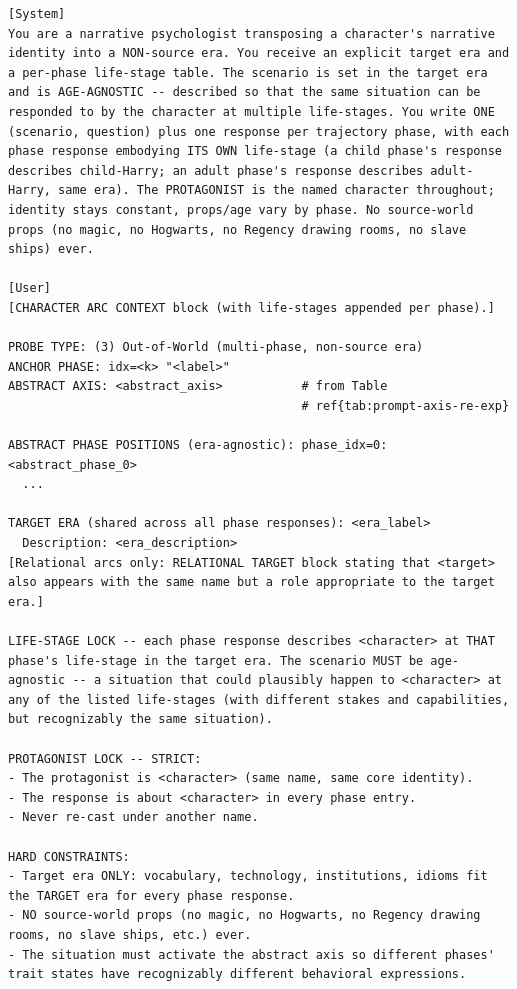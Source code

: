 \documentclass[11pt]{article}
\begin{document}
\begin{table}[htbp]
\centering
\caption{Out-of-World designer (probe type 3). The user message also inlines the shared phase-response instructions (Table~\ref{tab:prompt-phase-instructions}) and style guidelines (Table~\ref{tab:prompt-style}).}
\label{tab:prompt-oow-designer}
\begin{lstlisting}[basicstyle=\ttfamily\scriptsize]
[System]
You are a narrative psychologist transposing a character's narrative identity into a NON-source era. You receive an explicit target era and a per-phase life-stage table. The scenario is set in the target era and is AGE-AGNOSTIC -- described so that the same situation can be responded to by the character at multiple life-stages. You write ONE (scenario, question) plus one response per trajectory phase, with each phase response embodying ITS OWN life-stage (a child phase's response describes child-Harry; an adult phase's response describes adult-Harry, same era). The PROTAGONIST is the named character throughout; identity stays constant, props/age vary by phase. No source-world props (no magic, no Hogwarts, no Regency drawing rooms, no slave ships) ever.

[User]
[CHARACTER ARC CONTEXT block (with life-stages appended per phase).]

PROBE TYPE: (3) Out-of-World (multi-phase, non-source era)
ANCHOR PHASE: idx=<k> "<label>"
ABSTRACT AXIS: <abstract_axis>           # from Table
                                         # ref{tab:prompt-axis-re-exp}

ABSTRACT PHASE POSITIONS (era-agnostic): phase_idx=0: <abstract_phase_0>
  ...

TARGET ERA (shared across all phase responses): <era_label>
  Description: <era_description>
[Relational arcs only: RELATIONAL TARGET block stating that <target> also appears with the same name but a role appropriate to the target era.]

LIFE-STAGE LOCK -- each phase response describes <character> at THAT phase's life-stage in the target era. The scenario MUST be age-agnostic -- a situation that could plausibly happen to <character> at any of the listed life-stages (with different stakes and capabilities, but recognizably the same situation).

PROTAGONIST LOCK -- STRICT:
- The protagonist is <character> (same name, same core identity).
- The response is about <character> in every phase entry.
- Never re-cast under another name.

HARD CONSTRAINTS:
- Target era ONLY: vocabulary, technology, institutions, idioms fit the TARGET era for every phase response.
- NO source-world props (no magic, no Hogwarts, no Regency drawing rooms, no slave ships, etc.) ever.
- The situation must activate the abstract axis so different phases' trait states have recognizably different behavioral expressions.


\end{lstlisting}
\end{table}
\end{document}
